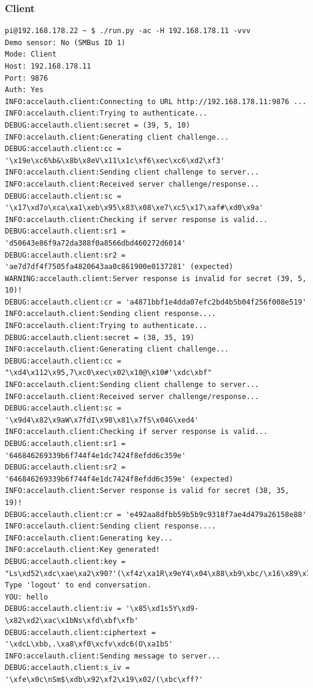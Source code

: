 \documentclass{article}
\begin{document}
\subsubsection*{Client}
\begin{lstlisting}
pi@192.168.178.22 ~ $ ./run.py -ac -H 192.168.178.11 -vvv
Demo sensor: No (SMBus ID 1)
Mode: Client
Host: 192.168.178.11
Port: 9876
Auth: Yes
INFO:accelauth.client:Connecting to URL http://192.168.178.11:9876 ...
INFO:accelauth.client:Trying to authenticate...
DEBUG:accelauth.client:secret = (39, 5, 10)
INFO:accelauth.client:Generating client challenge...
DEBUG:accelauth.client:cc = '\x19e\xc6%b&\x8b\x8eV\x11\x1c\xf6\xec\xc6\xd2\xf3'
INFO:accelauth.client:Sending client challenge to server...
INFO:accelauth.client:Received server challenge/response...
DEBUG:accelauth.client:sc = '\x17\xd7o\xca\xa1\xeb\x95\x83\x08\xe7\xc5\x17\xaf#\xd0\x9a'
INFO:accelauth.client:Checking if server response is valid...
DEBUG:accelauth.client:sr1 = 'd50643e86f9a72da388f0a8566dbd460272d6014'
DEBUG:accelauth.client:sr2 = 'ae7d7df4f7505fa4820643aa0c861900e0137281' (expected)
WARNING:accelauth.client:Server response is invalid for secret (39, 5, 10)!
DEBUG:accelauth.client:cr = 'a4871bbf1e4dda07efc2bd4b5b04f256f008e519'
INFO:accelauth.client:Sending client response....
INFO:accelauth.client:Trying to authenticate...
DEBUG:accelauth.client:secret = (38, 35, 19)
INFO:accelauth.client:Generating client challenge...
DEBUG:accelauth.client:cc = "\xd4\x112\x95,7\xc0\xec\x02\x10@\x10#'\xdc\xbf"
INFO:accelauth.client:Sending client challenge to server...
INFO:accelauth.client:Received server challenge/response...
DEBUG:accelauth.client:sc = '\x9d4\x82\x9aW\x7fdI\x98\x81\x7fS\x04G\xed4'
INFO:accelauth.client:Checking if server response is valid...
DEBUG:accelauth.client:sr1 = '646846269339b6f744f4e1dc7424f8efdd6c359e'
DEBUG:accelauth.client:sr2 = '646846269339b6f744f4e1dc7424f8efdd6c359e' (expected)
INFO:accelauth.client:Server response is valid for secret (38, 35, 19)!
DEBUG:accelauth.client:cr = 'e492aa8dfbb59b5b9c9318f7ae4d479a26158e88'
INFO:accelauth.client:Sending client response....
INFO:accelauth.client:Generating key...
INFO:accelauth.client:Key generated!
DEBUG:accelauth.client:key = "Ls\xd52\xdc\xae\xa2\x90?'(\xf4z\xa1R\x9eY4\x04\x88\xb9\xbc/\x16\x89\x12\xfbH\x0f\x08\x9a\xed"
Type 'logout' to end conversation.
YOU: hello
DEBUG:accelauth.client:iv = '\x85\xd1s5Y\xd9-\x82\xd2\xac\x1bNs\xfd\xbf\xfb'
DEBUG:accelauth.client:ciphertext = '\xdcL\xbb,.\xa8\xf0\xcfv\xdc6(O\xa1bS'
INFO:accelauth.client:Sending message to server...
DEBUG:accelauth.client:s_iv = '\xfe\x0c\nSm$\xdb\x92\xf2\x19\x02/(\xbc\xff?'

\end{lstlisting}
\end{document}

